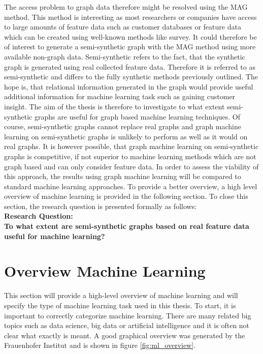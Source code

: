 	\noindent The access problem to graph data therefore might be resolved
	using the MAG method. This method is interesting as most researchers or
	companies have access to large amounts of feature data such as customer 
	databases or feature data which can be created using well-known methods
	like survey. It could therefore be of interest to generate a semi-synthetic 
	graph with the MAG method using more available non-graph data. 
	Semi-synthetic refers to the fact, that the synthetic graph is generated 
	using real collected feature data. Therefore it is referred to as
	semi-synthetic and differs to the fully synthetic methods previously outlined.
	The hope is, that relational information generated in the graph would
	provide useful additional information for machine learning task such as
	gaining customer insight. The aim of the thesis is therefore to investigate
	to what extent semi-synthetic graphs are useful for graph based machine
	learning techniques. Of course, semi-synthetic graphs cannot replace real
	graphs and graph machine learning on semi-synthetic graphs is unlikely to
	perform as well as it would on real graphs. It is however possible, that
	graph machine learning on semi-synthetic graphs is competitive, if not
	superior to machine learning methods which are not graph based and can only
	consider feature data. In order to assess the viability of this approach,
	the results using graph machine learning will be compared to standard
	machine learning approaches. To provide a better overview, a high level 
	overview of machine learning is provided in the following section. To close
	this section, the research question is presented formally as follows: \\

	\noindent\textbf{Research Question:}\\

	\textbf{To what extent are semi-synthetic graphs based on real 
				feature data useful for machine learning?}

	\section{Overview Machine Learning}

	This section will provide a high-level overview of machine learning and
	will specify the type of machine learning task used in this thesis. To
	start, it is important to correctly categorize machine learning. There are
	many related big topics such as data science, big data or artificial
	intelligence and it is often not clear what exactly is meant. A good
	graphical overview was generated by the Frauenhofer Institut and is shown
	in figure \ref{fig:ml_overview}.

